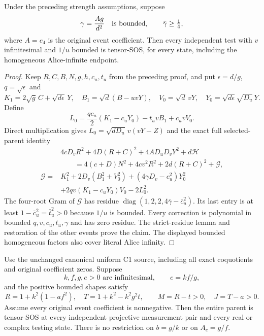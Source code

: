 \begin{lemma}
Under the preceding strength assumptions, suppose
\[
 \gamma=\frac{A g}{d^2}\quad\hbox{is bounded},\qquad \bar\gamma\geq\tfrac14,
\]
where $A=e_4$ is the original event coefficient. Then every independent
test with $v$ infinitesimal and $1/u$ bounded is tensor-SOS, for every
state, including the homogeneous Alice-infinite endpoint.
\end{lemma}
\begin{proof}
Keep $R,C,B,N,g,h,c_u,t_u$ from the preceding proof, and put
$\epsilon=d/g$, $q=\sqrt\epsilon$ and
\[
 K_1=2\sqrt g\,C+\sqrt{d\epsilon}\,Y,\quad
 B_1=\sqrt d(B-uvY),\quad V_0=\sqrt d\,vY,
 \quad Y_0=\sqrt{d\epsilon}\sqrt{D_u}\,Y.
\]
Define
\[
 L_0=\frac{qc_u}{2}(K_1-c_uY_0)-t_uvB_1+c_uvV_0.
\]
Direct multiplication gives $L_0=\sqrt{dD_u}\,v(vY-Z)$ and the exact
full selected-parent identity
\[
\begin{split}
&4cD_vR^2+4D(R+C)^2+4AD_uD_vY^2+d\mathcal H\\
&\qquad=4(c+D)N^2+4cv^2R^2+2d(R+C)^2+\mathcal G,\\
\mathcal G={}&K_1^2+2D_v(B_1^2+V_0^2)
 +(4\gamma D_v-c_u^2)Y_0^2\\
&+2qv(K_1-c_uY_0)V_0-2L_0^2.
\end{split}
\]
The four-root Gram of $\mathcal G$ has residue
$\operatorname{diag}(1,2,2,4\bar\gamma-\bar c_u^2)$.
Its last entry is at least $1-\bar c_u^2=\bar t_u^2>0$ because $1/u$
is bounded. Every correction is polynomial in bounded
$q,v,c_u,t_u,\gamma$ and has zero residue. The strict-residue lemma and
restoration of the other events prove the claim. The displayed bounded
homogeneous factors also cover literal Alice infinity.
\end{proof}

\begin{theorem}
\label{p6cad7544d1b8:thm:c1-uniform-all-tests}
Use the unchanged canonical uniform C1 source, including all exact
coquotients and original coefficient zeros. Suppose
\[
 k,f,g,e>0\text{ are infinitesimal},\qquad e=kf/g,
\]
and the positive bounded shapes satisfy
\[
 R=1+k^2(1-af^2),\quad T=1+k^2-k^2g^2t,\qquad
 M=R-t>0,\quad J=T-a>0.
\]
Assume every original event coefficient is nonnegative. Then the entire
parent is tensor-SOS at every independent projective measurement pair
and every real or complex testing state. There is no restriction on
$b=g/k$ or on $A_c=g/f$.
\end{theorem}

